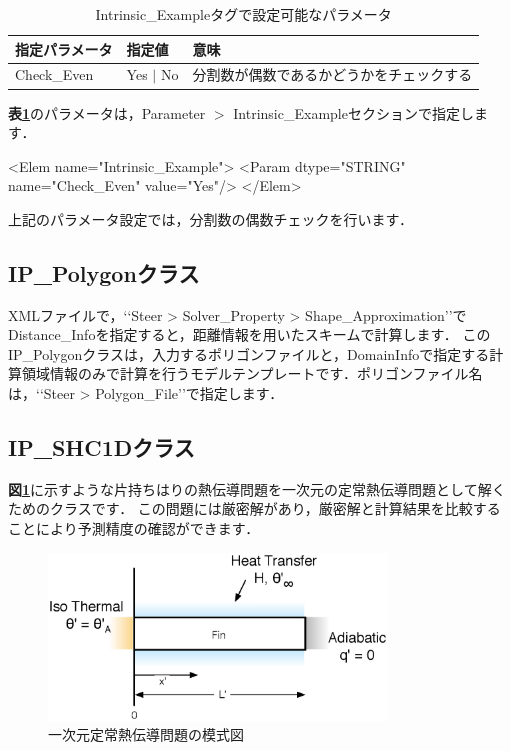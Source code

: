 \begin{table}[htdp]
\caption{Intrinsic\_Exampleタグで設定可能なパラメータ}
\begin{center}
\small
\begin{tabular}{lll}\toprule
指定パラメータ & 指定値 & 意味\\ \midrule
Check\_Even & Yes $|$ No & 分割数が偶数であるかどうかをチェックする\\
\bottomrule
\end{tabular}
\end{center}
\label{tbl:rect parameter}
\end{table}

\textbf{表\ref{tbl:rect parameter}}のパラメータは，Parameter $>$ Intrinsic\_Exampleセクションで指定します．

{ \small
\begin{program}
<Elem name="Intrinsic_Example">
  <Param dtype="STRING" name="Check_Even" value="Yes"/>
</Elem>
\end{program}
}

上記のパラメータ設定では，分割数の偶数チェックを行います．

%
\subsection{IP\_Polygonクラス}
XMLファイルで，\lq\lq Steer > Solver\_Property > Shape\_Approximation\rq\rq でDistance\_Infoを指定すると，距離情報を用いたスキームで計算します．
この\hypertarget{tgt:polygon_class}{IP\_Polygonクラス}は，入力するポリゴンファイルと，DomainInfoで指定する計算領域情報のみで計算を行うモデルテンプレートです．ポリゴンファイル名は，\lq\lq Steer > Polygon\_File\rq\rq で指定します．

%
\subsection{IP\_SHC1Dクラス}
\textbf{図\ref{fig:HC1D}}に示すような片持ちはりの熱伝導問題を一次元の定常熱伝導問題として解くためのクラスです．
この問題には厳密解があり，厳密解と計算結果を比較することにより予測精度の確認ができます．

\begin{figure}[htdp]
\begin{center}
\includegraphics[width=9cm,clip]{1DHC.eps}
\end{center}
\caption{一次元定常熱伝導問題の模式図}
\label{fig:HC1D}
\end{figure}



